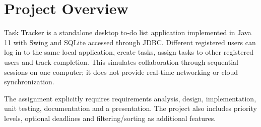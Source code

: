 \documentclass[11pt,a4paper]{article}
\begin{document}

\section{Project Overview}
Task Tracker is a standalone desktop to-do list application implemented in Java 11 with Swing and SQLite accessed through JDBC. Different registered users can log in to the same local application, create tasks, assign tasks to other registered users and track completion. This simulates collaboration through sequential sessions on one computer; it does not provide real-time networking or cloud synchronization.

The assignment explicitly requires requirements analysis, design, implementation, unit testing, documentation and a presentation. The project also includes priority levels, optional deadlines and filtering/sorting as additional features.
\end{document}
